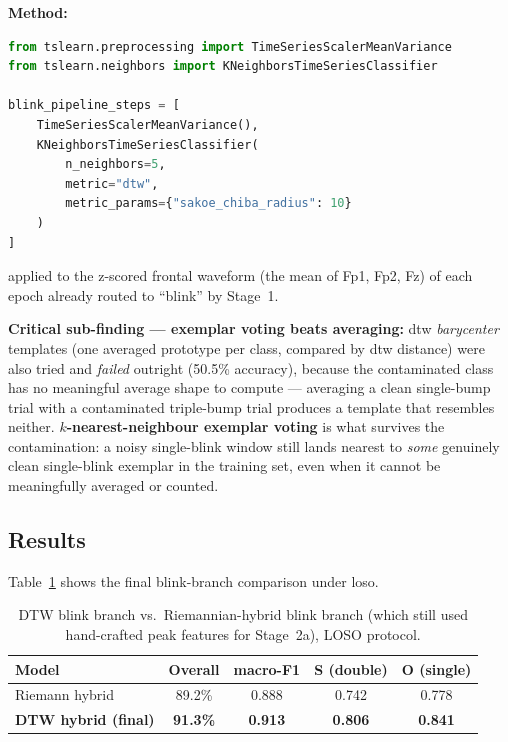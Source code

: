 \textbf{Method:}

\begin{lstlisting}[language=Python,
    caption={DTW blink sub-classifier pipeline (Stage~2a,
    production).},
    label={lst:dtw}]
from tslearn.preprocessing import TimeSeriesScalerMeanVariance
from tslearn.neighbors import KNeighborsTimeSeriesClassifier

blink_pipeline_steps = [
    TimeSeriesScalerMeanVariance(),
    KNeighborsTimeSeriesClassifier(
        n_neighbors=5,
        metric="dtw",
        metric_params={"sakoe_chiba_radius": 10}
    )
]
\end{lstlisting}

\noindent applied to the z-scored frontal waveform (the mean of
Fp1, Fp2, Fz) of each epoch already routed to ``blink'' by Stage~1.

\textbf{Critical sub-finding --- exemplar voting beats averaging:}
\acrshort{dtw} \emph{barycenter} templates (one averaged prototype
per class, compared by \acrshort{dtw} distance) were also tried and
\emph{failed} outright (50.5\% accuracy), because the contaminated
 class has no meaningful average shape to
compute --- averaging a clean single-bump trial with a contaminated
triple-bump trial produces a template that resembles neither.
\textbf{$k$-nearest-neighbour exemplar voting} is what survives the
contamination: a noisy single-blink window still lands nearest to
\emph{some} genuinely clean single-blink exemplar in the training
set, even when it cannot be meaningfully averaged or counted.

\subsection{Results}

Table~\ref{tab:dtw_results} shows the final blink-branch comparison
under \acrshort{loso}.

\begin{table}[htbp]
\centering
\caption{DTW blink branch vs.\ Riemannian-hybrid blink branch
(which still used hand-crafted peak features for Stage~2a), LOSO
protocol.}
\label{tab:dtw_results}
\renewcommand{\arraystretch}{1.3}
\begin{tabular}{l c c c c}
\toprule
\textbf{Model} & \textbf{Overall} & \textbf{macro-F1} &
\textbf{S (double)} & \textbf{O (single)} \\
\midrule
Riemann hybrid & 89.2\% & 0.888 & 0.742 & 0.778 \\
\textbf{DTW hybrid (final)} & \textbf{91.3\%} & \textbf{0.913} &
\textbf{0.806} & \textbf{0.841} \\
\bottomrule
\end{tabular}
\end{table}

